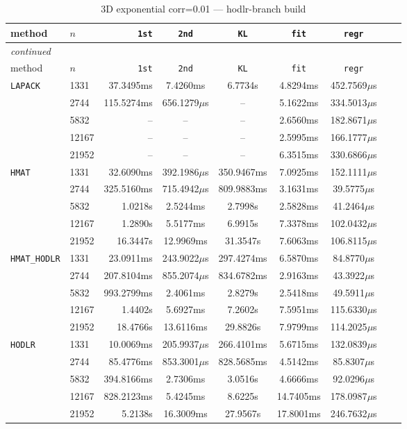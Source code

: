 \documentclass[11pt,a4paper]{article}
\begin{document}
\begin{center}
\begin{longtable}{llrcccccc}
\caption{3D exponential corr=0.01 --- hodlr-branch build}
\\\toprule
method & $n$ & \texttt{1st} & \texttt{2nd} & \texttt{KL} & \texttt{fit} & \texttt{regr}\\
\midrule
\endfirsthead
\multicolumn{8}{l}{\small\emph{continued}}\\
\toprule
method & $n$ & \texttt{1st} & \texttt{2nd} & \texttt{KL} & \texttt{fit} & \texttt{regr}\\
\midrule
\endhead

\texttt{LAPACK} & 1331 & 37.3495ms & 7.4260ms & 6.7734s & 4.8294ms & 452.7569$\mu$s\\
 & 2744 & 115.5274ms & 656.1279$\mu$s & -- & 5.1622ms & 334.5013$\mu$s\\
 & 5832 & -- & -- & -- & 2.6560ms & 182.8671$\mu$s\\
 & 12167 & -- & -- & -- & 2.5995ms & 166.1777$\mu$s\\
 & 21952 & -- & -- & -- & 6.3515ms & 330.6866$\mu$s\\
\texttt{HMAT} & 1331 & 32.6090ms & 392.1986$\mu$s & 350.9467ms & 7.0925ms & 152.1111$\mu$s\\
 & 2744 & 325.5160ms & 715.4942$\mu$s & 809.9883ms & 3.1631ms & 39.5775$\mu$s\\
 & 5832 & 1.0218s & 2.5244ms & 2.7998s & 2.5828ms & 41.2464$\mu$s\\
 & 12167 & 1.2890s & 5.5177ms & 6.9915s & 7.3378ms & 102.0432$\mu$s\\
 & 21952 & 16.3447s & 12.9969ms & 31.3547s & 7.6063ms & 106.8115$\mu$s\\
\texttt{HMAT\_HODLR} & 1331 & 23.0911ms & 243.9022$\mu$s & 297.4274ms & 6.5870ms & 84.8770$\mu$s\\
 & 2744 & 207.8104ms & 855.2074$\mu$s & 834.6782ms & 2.9163ms & 43.3922$\mu$s\\
 & 5832 & 993.2799ms & 2.4061ms & 2.8279s & 2.5418ms & 49.5911$\mu$s\\
 & 12167 & 1.4402s & 5.6927ms & 7.2602s & 7.5951ms & 115.6330$\mu$s\\
 & 21952 & 18.4766s & 13.6116ms & 29.8826s & 7.9799ms & 114.2025$\mu$s\\
\texttt{HODLR} & 1331 & 10.0069ms & 205.9937$\mu$s & 266.4101ms & 5.6715ms & 132.0839$\mu$s\\
 & 2744 & 85.4776ms & 853.3001$\mu$s & 828.5685ms & 4.5142ms & 85.8307$\mu$s\\
 & 5832 & 394.8166ms & 2.7306ms & 3.0516s & 4.6666ms & 92.0296$\mu$s\\
 & 12167 & 828.2123ms & 5.4245ms & 8.6225s & 14.7405ms & 178.0987$\mu$s\\
 & 21952 & 5.2138s & 16.3009ms & 27.9567s & 17.8001ms & 246.7632$\mu$s\\
\bottomrule\end{longtable}\end{center}
\end{document}

